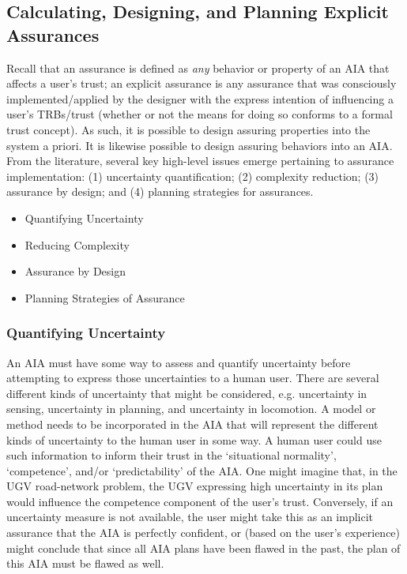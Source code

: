\subsection{Calculating, Designing, and Planning Explicit Assurances}
    Recall that an assurance is defined as \emph{any} behavior or property of an AIA that affects a user's trust; an explicit assurance is any assurance that was consciously implemented/applied by the designer with the express intention of influencing a user's TRBs/trust (whether or not the means for doing so conforms to a formal trust concept). As such, it is possible to design assuring properties into the system a priori. It is likewise possible to design assuring behaviors into an AIA. From the literature, several key high-level issues emerge pertaining to assurance implementation: (1) uncertainty quantification; (2) complexity reduction; (3) assurance by design; and (4) planning strategies for assurances. 


    \begin{itemize}
        \item Quantifying Uncertainty
        \item Reducing Complexity
        \item Assurance by Design
        \item Planning Strategies of Assurance
    \end{itemize}

\subsubsection{Quantifying Uncertainty} %
    An AIA must have some way to assess and quantify uncertainty before attempting to express those uncertainties to a human user. 
    There are several different kinds of uncertainty that might be considered, e.g. uncertainty in sensing, uncertainty in planning, and uncertainty in locomotion. 
    A model or method needs to be incorporated in the AIA that will represent the different kinds of uncertainty to the human user in some way. 
    A human user could use such information to inform their trust in the `situational normality', `competence', and/or `predictability' of the AIA. 
    One might imagine that, in the UGV road-network problem, the UGV expressing high uncertainty in its plan would influence the competence component of the user's trust. Conversely, if an uncertainty measure is not available, the user might take this as an implicit assurance that the AIA is perfectly confident, or (based on the user's experience)  might conclude that since all AIA plans have been flawed in the past, the plan of this AIA must be flawed as well. 

